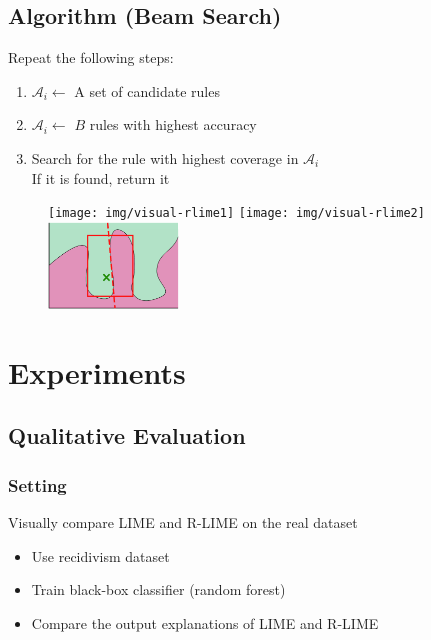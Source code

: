 \documentclass[aspectratio=169]{slide-en}
\begin{document}
\subsection{Algorithm (Beam Search)}

\begin{frame}{}
  \bigskip
  \bigskip
  Repeat the following steps:
  \begin{enumerate}
    \item $\mathcal{A}_i\gets$ A set of candidate rules
    \item $\mathcal{A}_i\gets$ $B$ rules with highest accuracy
    \item Search for the rule with highest coverage in $\mathcal{A}_i$ \\
          If it is found, return it
  \end{enumerate}
  \vspace{-1em}
  \begin{figure}[t]
    \centering
    \texttt{[image: img/visual-rlime1]}
    \texttt{[image: img/visual-rlime2]}
    \includegraphics[width=0.31\textwidth]{img/visual-rlime3}
  \end{figure}
\end{frame}

\section{Experiments}

\subsection{Qualitative Evaluation}

\subsubsection{Setting}

\begin{frame}{}
  Visually compare LIME and R-LIME on the real dataset
  \begin{itemize}
    \item Use recidivism dataset
    \item Train black-box classifier (random forest)
    \item Compare the output explanations of LIME and R-LIME
  \end{itemize}
\end{frame}
\end{document}
